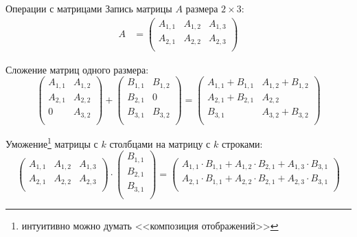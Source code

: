 \documentclass[utf8,xcolor=table]{beamer}
\begin{document}
\begin{frame}[t]{Операции с матрицами}
	Запись матрицы $A$ размера $2 \times 3$:
	\begin{align*}
		A &= \begin{pmatrix}
			A_{1,1} & A_{1,2} & A_{1,3} \\
			A_{2,1} & A_{2,2} & A_{2,3} \\
		\end{pmatrix}
	\end{align*}

	Сложение матриц одного размера:
	\[
		\begin{pmatrix}
			A_{1,1} & A_{1,2} \\
			A_{2,1} & A_{2,2} \\
			0 & A_{3,2} \\
		\end{pmatrix}
		+
		\begin{pmatrix}
			B_{1,1} & B_{1,2} \\
			B_{2,1} & 0 \\
			B_{3,1} & B_{3,2} \\
		\end{pmatrix}
		=
		\begin{pmatrix}
			A_{1,1}+B_{1,1} & A_{1,2}+B_{1,2} \\
			A_{2,1}+B_{2,1} & A_{2,2} \\
			B_{3,1} & A_{3,2}+B_{3,2} \\
		\end{pmatrix}
	\]

	Уможение\footnote{интуитивно можно думать <<композиция отображений>>} матрицы с $k$ столбцами на матрицу с $k$ строками:
	\[
		\begin{pmatrix}
			A_{1,1} & A_{1,2} & A_{1,3} \\
			A_{2,1} & A_{2,2} & A_{2,3} \\
		\end{pmatrix}
		\cdot
		\begin{pmatrix}
			B_{1,1} \\
			B_{2,1} \\
			B_{3,1} \\
		\end{pmatrix}
		=
		\begin{pmatrix}
			A_{1,1} \cdot B_{1,1} + A_{1,2} \cdot B_{2,1} + A_{1,3} \cdot B_{3,1} \\
			A_{2,1} \cdot B_{1,1} + A_{2,2} \cdot B_{2,1} + A_{2,3} \cdot B_{3,1} \\
		\end{pmatrix}
	\]
\end{frame}
\end{document}
